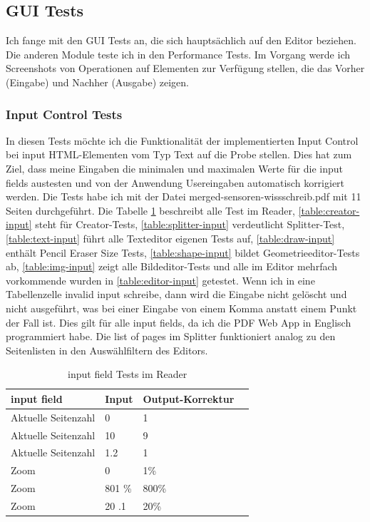 \subsection{GUI Tests}
Ich fange mit den GUI Tests an, die sich hauptsächlich auf den Editor beziehen. Die anderen Module teste ich in den Performance Tests. Im Vorgang werde ich Screenshots von Operationen auf Elementen zur Verfügung stellen, die das Vorher (Eingabe) und Nachher (Ausgabe) zeigen.

\subsubsection{Input Control Tests}
In diesen Tests möchte ich die Funktionalität der implementierten Input Control bei input HTML-Elementen vom Typ Text auf die Probe stellen. Dies hat zum Ziel, dass meine Eingaben die minimalen und maximalen Werte für die input fields austesten und von der Anwendung Usereingaben automatisch korrigiert werden. Die Tests habe ich mit der Datei merged-sensoren-wissschreib.pdf mit 11 Seiten durchgeführt. Die Tabelle \ref{table:reader-input} beschreibt alle Test im Reader, \ref{table:creator-input} steht für Creator-Tests, \ref{table:splitter-input} verdeutlicht Splitter-Test, \ref{table:text-input} führt alle Texteditor eigenen Tests auf, \ref{table:draw-input} enthält Pencil Eraser Size Tests, \ref{table:shape-input} bildet Geometrieeditor-Tests ab, \ref{table:img-input} zeigt alle Bildeditor-Tests und alle im Editor mehrfach vorkommende wurden in \ref{table:editor-input} getestet. Wenn ich in eine Tabellenzelle invalid input schreibe, dann wird die Eingabe nicht gelöscht und nicht ausgeführt, was bei einer Eingabe von einem Komma anstatt einem Punkt der Fall ist. Dies gilt für alle input fields, da ich die PDF Web App in Englisch programmiert habe. Die list of pages im Splitter funktioniert analog zu den Seitenlisten in den Auswählfiltern des Editors.

\begin{table}[!htbp]
	\centering
	\begin{tabular}{|p{4cm}|p{3cm}|p{3cm}|p{3cm}|}
		\hline
		\textbf{input field}				& \textbf{Input} 	& \textbf{Output-Korrektur}	\\ 
		\hline
		Aktuelle Seitenzahl					& 0 				& 1							\\ 
		Aktuelle Seitenzahl					& 10 				& 9 						\\ 
		Aktuelle Seitenzahl					& 1.2 				& 1 						\\ 
		Zoom 								& 0					& 1\%  						\\
		Zoom 								& 801 \% 			& 800\% 					\\ 
		Zoom 								& 20 .1 			& 20\% 						\\ 
		\hline
	\end{tabular}
	\caption{input field Tests im Reader}
	\label{table:reader-input}
\end{table}	


